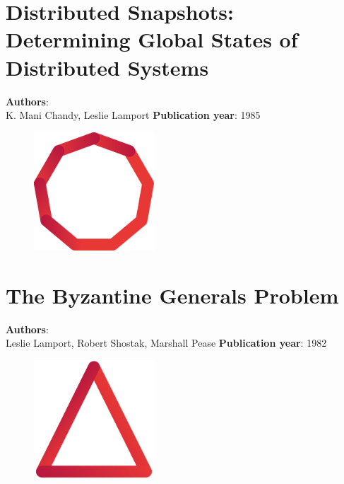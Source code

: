 \documentclass[11pt,fleqn]{book} %
\begin{document}
\chapter{Distributed Snapshots: Determining Global States of Distributed Systems}
\vspace*{-7mm}
\Large \textbf{Authors}: \\
K. Mani Chandy, Leslie Lamport
\newline\newline
\textbf{Publication year}: 1985
\begin{figure}[b]
    \centering
    \includegraphics[width=0.4\textwidth]{distributed-systems-red.pdf}
\end{figure}


\chapter{The Byzantine Generals Problem}
\vspace*{-7mm}
\Large \textbf{Authors}: \\
Leslie Lamport, Robert Shostak, Marshall Pease
\newline\newline
\textbf{Publication year}: 1982
\begin{figure}[b]
    \centering
    \includegraphics[width=0.4\textwidth]{distributed-systems-triangle-red.pdf}
\end{figure}

\end{document}
